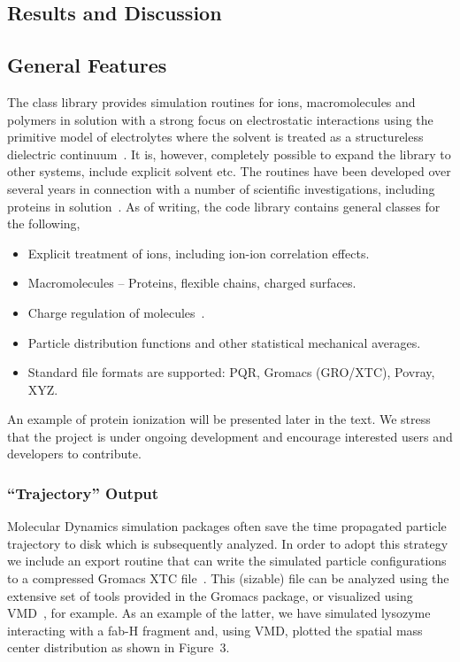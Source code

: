 \documentclass[10pt]{bmc_article}
\newenvironment{bmcformat}{\begin{raggedright}\baselineskip20pt\sloppy\setboolean{publ}{false}}{\end{raggedright}\baselineskip20pt\sloppy}
\begin{document}
\begin{bmcformat}
 
\section*{Results and Discussion}
\subsection*{General Features}
The class library provides simulation routines for ions, macromolecules and polymers in solution with a strong focus on electrostatic interactions using the primitive model of electrolytes where the solvent is treated as a structureless dielectric continuum~\cite{hill:86}.
It is, however, completely possible to expand the library to other systems, include explicit solvent etc. The routines have been developed over several years in connection with a number of scientific investigations, including proteins in solution~\cite{lund-thesis}.
As of writing, the code library contains general classes for the following,
\begin{itemize}
\item Explicit treatment of ions, including ion-ion correlation effects.
\item Macromolecules -- Proteins, flexible chains, charged surfaces.
\item Charge regulation of molecules~\cite{lund:05}.
\item Particle distribution functions and other statistical mechanical averages.
\item Standard file formats are supported: PQR, Gromacs (GRO/XTC), Povray, XYZ.
\end{itemize}
An example of protein ionization will be presented later in the text.
We stress that the project is under ongoing development and encourage interested users and developers to contribute.

\subsubsection*{``Trajectory'' Output}
Molecular Dynamics simulation packages often save the time propagated particle trajectory to disk which is subsequently analyzed.
In order to adopt this strategy we include an export routine that can write the simulated particle configurations to a compressed Gromacs XTC file~\cite{gromacs}.
This (sizable) file can be analyzed using the extensive set of tools provided in the Gromacs package, or visualized using VMD~\cite{vmd}, for example.
As an example of the latter, we have simulated lysozyme interacting with a fab-H fragment and, using VMD, plotted the spatial mass center distribution as shown in Figure~3.


\end{bmcformat}
\end{document}
